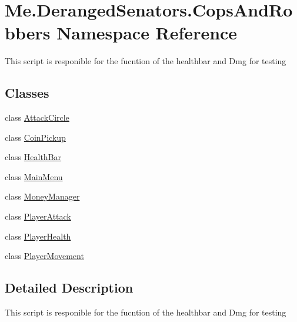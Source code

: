 \hypertarget{namespaceMe_1_1DerangedSenators_1_1CopsAndRobbers}{}\section{Me.\+Deranged\+Senators.\+Cops\+And\+Robbers Namespace Reference}
\label{namespaceMe_1_1DerangedSenators_1_1CopsAndRobbers}


This script is responible for the fucntion of the healthbar and Dmg for testing  


\subsection*{Classes}
\begin{DoxyCompactItemize}
\item 
class \hyperlink{classMe_1_1DerangedSenators_1_1CopsAndRobbers_1_1AttackCircle}{Attack\+Circle}
\item 
class \hyperlink{classMe_1_1DerangedSenators_1_1CopsAndRobbers_1_1CoinPickup}{Coin\+Pickup}
\item 
class \hyperlink{classMe_1_1DerangedSenators_1_1CopsAndRobbers_1_1HealthBar}{Health\+Bar}
\item 
class \hyperlink{classMe_1_1DerangedSenators_1_1CopsAndRobbers_1_1MainMenu}{Main\+Menu}
\item 
class \hyperlink{classMe_1_1DerangedSenators_1_1CopsAndRobbers_1_1MoneyManager}{Money\+Manager}
\item 
class \hyperlink{classMe_1_1DerangedSenators_1_1CopsAndRobbers_1_1PlayerAttack}{Player\+Attack}
\item 
class \hyperlink{classMe_1_1DerangedSenators_1_1CopsAndRobbers_1_1PlayerHealth}{Player\+Health}
\item 
class \hyperlink{classMe_1_1DerangedSenators_1_1CopsAndRobbers_1_1PlayerMovement}{Player\+Movement}
\end{DoxyCompactItemize}


\subsection{Detailed Description}
This script is responible for the fucntion of the healthbar and Dmg for testing 

